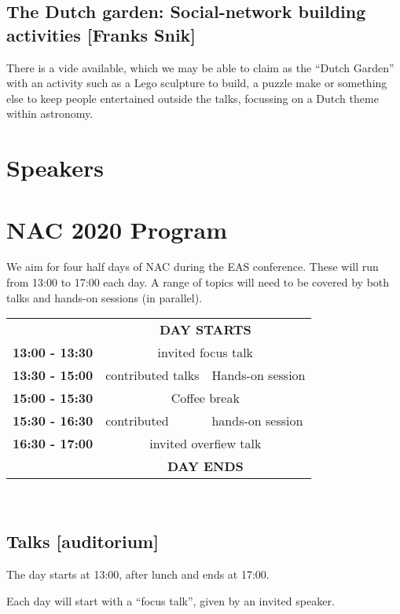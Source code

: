 \documentclass{article}
\begin{document}
\subsection{The Dutch garden: Social-network building activities [Franks Snik]}

There is a vide available, which we may be able to claim as the
``Dutch Garden'' with an activity such as a Lego sculpture to build, a
puzzle make or something else to keep people entertained outside the
talks, focussing on a Dutch theme within astronomy.

\section{Speakers}

\section{NAC 2020 Program}

We aim for four half days of NAC during the EAS conference. These
will run from 13:00 to 17:00 each day. A range of topics will need to
be covered by both talks and hands-on sessions (in parallel).

\begin{tabular}{ll|l}
    & \multicolumn{2}{c}{\textbf{DAY STARTS}} \\
    \cline{2-3}
    \textbf{13:00 - 13:30} & \multicolumn{2}{c}{invited focus talk} \\
    \textbf{13:30 - 15:00} & contributed talks & Hands-on session \\
    \textbf{15:00 - 15:30} & \multicolumn{2}{c}{Coffee break} \\
    \textbf{15:30 - 16:30} & contributed & hands-on session \\
    \textbf{16:30 - 17:00} & \multicolumn{2}{c}{invited overfiew talk} \\
    \cline{2-3}
    & \multicolumn{2}{c}{\textbf{DAY ENDS}}
\end{tabular}\\%

\subsection{Talks [auditorium]}

The day starts at 13:00, after lunch and ends at 17:00.

Each day will start with a ``focus talk'', given by an invited speaker.
\end{document}
